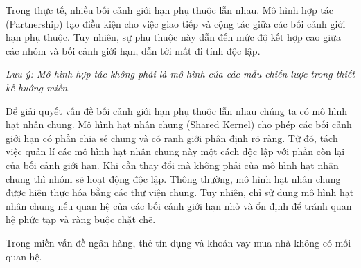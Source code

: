 Trong thực tế,      nhiều    bối cảnh giới hạn phụ thuộc lẫn nhau.   Mô hình hợp tác (Partnership)   tạo điều kiện     cho việc giao tiếp và cộng tác giữa các       bối cảnh giới hạn phụ thuộc. Tuy nhiên,  sự phụ thuộc     này dẫn đến mức độ kết hợp cao giữa các nhóm và bối cảnh giới hạn,  dẫn tới mất đi tính độc lập. 

\textit{Lưu ý:    Mô hình hợp tác  không phải là mô hình  của  các mẫu chiến lược trong thiết kế huớng miền.}  


Để giải quyết vấn đề   bối cảnh giới hạn phụ thuộc lẫn nhau chúng ta có mô hình      hạt nhân chung.  Mô hình hạt nhân chung (Shared Kernel) cho phép   các    bối cảnh giới hạn  có phần chia sẻ chung  và  có  ranh giới   phân định rõ ràng.  Từ đó, tách việc quản lí các mô hình hạt nhân chung này một cách độc lập với phần còn lại của bối cảnh giới hạn. Khi cần  thay đổi mà không phải của mô hình hạt nhân chung thì nhóm sẽ   hoạt động độc lập.    Thông thường, mô hình hạt nhân chung được hiện thực hóa bằng các thư viện chung.      Tuy nhiên, chỉ sử dụng mô hình hạt nhân chung nếu quan hệ của các   bối cảnh giới hạn   nhỏ và ổn định   để tránh    quan hệ    phức tạp và ràng buộc  chặt chẽ.



\begin{example} Trong miền vấn đề ngân hàng,     thẻ tín dụng và khoản vay mua nhà không có mối quan hệ. 
    
\end{example} 
